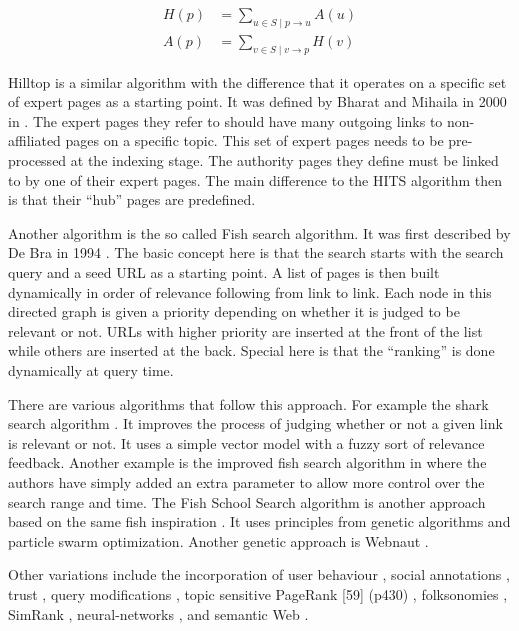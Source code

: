 \begin{equation}
  \begin{split}
  H(p) &= \sum_{u\in S \mid p\to u}A(u)\\
  A(p) &= \sum_{v\in S \mid v\to p}H(v)
  \end{split}
  \label{eq:HITS}
\end{equation}

Hilltop is a similar algorithm with the difference that it operates on a specific set of expert pages as a starting point. It was defined by Bharat and Mihaila in 2000 in \autocite{Bharat2000}. The expert pages they refer to should have many outgoing links to non-affiliated pages on a specific topic. This set of expert pages needs to be pre-processed at the indexing stage. The authority pages they define must be linked to by one of their expert pages. The main difference to the HITS algorithm then is that their ``hub'' pages are predefined.

Another algorithm is the so called Fish search algorithm. It was first described by De Bra in 1994 \autocite{DeBra1994, DeBra1994a, DeBra}. The basic concept here is that the search starts with the search query and a seed URL as a starting point. A list of pages is then built dynamically in order of relevance following from link to link. Each node in this directed graph is given a priority depending on whether it is judged to be relevant or not. URLs with higher priority are inserted at the front of the list while others are inserted at the back. Special here is that the ``ranking'' is done dynamically at query time.

There are various algorithms that follow this approach. For example the shark search algorithm \autocite{Hersovici1998}. It improves the process of judging whether or not a given link is relevant or not. It uses a simple vector model with a fuzzy sort of relevance feedback. Another example is the improved fish search algorithm in \autocite{Luo2005} where the authors have simply added an extra parameter to allow more control over the search range and time. The Fish School Search algorithm is another approach based on the same fish inspiration \autocite{BastosFilho2008}. It uses principles from genetic algorithms and particle swarm optimization. Another genetic approach is Webnaut \autocite{Nick2001}.

Other variations include the incorporation of user behaviour \autocite{Agichtein2006}, social annotations \autocite{Bao2007}, trust \autocite{Garcia-Molina2004}, query modifications \autocite{Glover2001}, topic sensitive PageRank [59] (p430) \autocite{Haveliwala2003}, folksonomies \autocite{Hotho}, SimRank \autocite{Jeh}, neural-networks \autocite{Shu1999}, and semantic Web \autocite{Widyantoro2001,Du2007,Ding,Kamps,Taye2009}.


